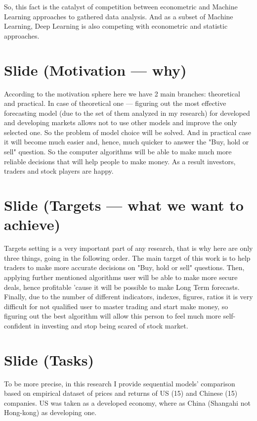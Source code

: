 \documentclass[a4paper, 12pt]{article}
\begin{document}
		So, this fact is the catalyst of competition between econometric and Machine Learning approaches to gathered data analysis. And as a subset of Machine Learning, Deep Learning is also competing with econometric and statistic approaches.
	\section{Slide (Motivation --- why)}
		According to the motivation sphere here we have 2 main branches: theoretical and practical. In case of theoretical one --- figuring out the most effective forecasting model (due to the set of them analyzed in my research) for developed and developing markets allows not to use other models and improve the only selected one. So the problem of model choice will be solved. And in practical case it will become much easier and, hence, much quicker to answer the "Buy, hold or sell" question. So the computer algorithms will be able to make much more reliable decisions that will help people to make money. As a result investors, traders and stock players are happy. 
	\section{Slide (Targets --- what we want to achieve)}
		Targets setting is a very important part of any research, that is why here are only three things, going in the following order. The main target of this work is to help traders to make more accurate decisions on "Buy, hold or sell" questions. Then, applying further mentioned algorithms user will be able to make more secure deals, hence profitable 'cause it will be possible to make Long Term forecasts. Finally, due to the number of different indicators, indexes, figures, ratios it is very difficult for not qualified user to master trading and start make money, so figuring out the best algorithm will allow this person to feel much more self-confident in investing and stop being scared of stock market. 
	\section{Slide (Tasks)}
		To be more precise, in this research I provide sequential models' comparison based on empirical dataset of prices and returns of US (15) and Chinese (15)  companies. US was taken as a developed economy, where as China (Shangahi not Hong-kong) as developing one.
\end{document}

